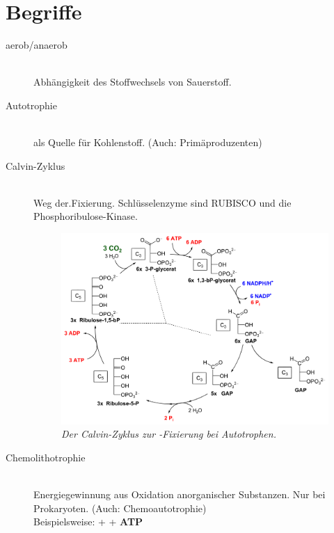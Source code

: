 \section{Begriffe}
\label{sec:facts}


\begin{description}
	\item[aerob/anaerob]\hfill \\
		Abhängigkeit des Stoffwechsels von Sauerstoff.

	\item[Autotrophie] \hfill \\
		 als Quelle für Kohlenstoff.
		(Auch: Primäproduzenten)

	\item[Calvin-Zyklus]	\hfill \\
		Weg der.Fixierung.
		Schlüsselenzyme sind RUBISCO und die Phosphoribulose-Kinase.

		\begin{figure}[ht!]
		\leavevmode
		\begin{center}
		\includegraphics[scale=0.30]{./pictures/calvin_detail_1000}
		\end{center}
		\caption{\slshape{Der Calvin-Zyklus zur -Fixierung bei Autotrophen.}}
		\label{fig:calvinDetail}
		\end{figure}

	\item[Chemolithotrophie]	\hfill \\
		Energiegewinnung aus Oxidation anorganischer Substanzen.
		Nur bei Prokaryoten.
		(Auch: Chemoautotrophie)\\
		Beispielsweise: \textbf{} +  \textrightarrow  {} + \textbf{ATP}


\end{description}

